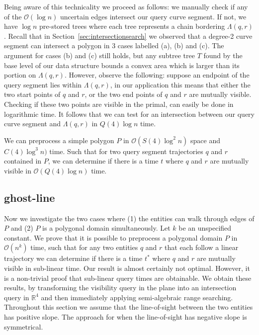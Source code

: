 \documentclass[UKenglish]{lipics-v2019}
\begin{document}
%
Being aware of this technicality we proceed as follows: we manually check if any of the $\mathcal{O}(\log n)$ uncertain edges intersect our query curve segment. If not, we have $\log n$ pre-stored trees where each tree represents a chain bordering $\Lambda(q,r)$. Recall that in Section~\ref{sec:intersectionsearch} we observed that a degree-2 curve segment can intersect a polygon in 3 cases labelled (a), (b) and (c). The argument for cases (b) and (c) still holds, but any subtree tree $T$ found by the base level of our data structure bounds a convex area which is larger than its portion on $\Lambda(q,r)$. However, observe the following: suppose an endpoint of the query segment lies within $\Lambda(q,r)$, in our application this means that either the two start points of $q$ and $r$, or the two end points of $q$ and $r$ are mutually visible. Checking if these two points are visible in the primal, can easily be done in logarithmic time. It follows that we can test for an intersection between our query curve segment and $\Lambda(q,r)$ in $Q(4) \log n$ time.

\begin{theorem}
    We can preprocess a simple polygon $P$ in $\mathcal{O}(S(4)\log^2 n)$ space and $C(4) \log^3 n)$ time. Such that for two query segment trajectories $q$ and $r$ contained in $P$, we can determine if there is a time $t$ where $q$ and $r$ are mutually visible in $\mathcal{O}(Q(4) \log n)$ time.
\end{theorem}

\subsection{ghost-line}

Now we investigate the two cases where (1) the entities can walk through edges of $P$ and (2) $P$ is a polygonal domain simultaneously. Let $k$ be an unspecified constant. We prove that it is possible to preprocess a polygonal domain $P$ in $\mathcal{O}(n^k)$ time, such that for any two entities $q$ and $r$ that each follow a linear trajectory we can determine if there is a time $t^*$ where $q$ and $r$ are mutually visible in sub-linear time. Our result is almost certainly not optimal. However, it is a non-trivial proof that sub-linear query times are obtainable. We obtain these results, by transforming the visibility query in the plane into an intersection query in $\mathbb{R}^4$ and then immediately applying semi-algebraic range searching. Throughout this section we assume that the line-of-sight between the two entities has positive slope. The approach for when the line-of-sight has negative slope is symmetrical. 
\end{document}
